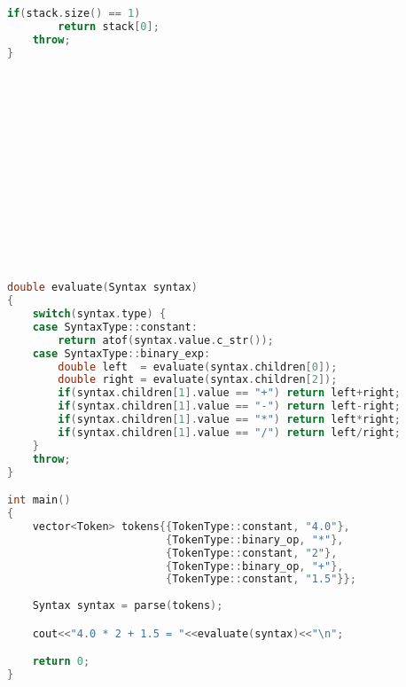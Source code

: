 \documentclass{scrartcl}
\begin{document}
{\begin{lstlisting}[language=C++]
    if(stack.size() == 1)
        return stack[0];
    throw;
}















double evaluate(Syntax syntax)
{
    switch(syntax.type) {
    case SyntaxType::constant:
        return atof(syntax.value.c_str());
    case SyntaxType::binary_exp:
        double left  = evaluate(syntax.children[0]);
        double right = evaluate(syntax.children[2]);
        if(syntax.children[1].value == "+") return left+right;
        if(syntax.children[1].value == "-") return left-right;
        if(syntax.children[1].value == "*") return left*right;
        if(syntax.children[1].value == "/") return left/right;
    }
	throw;
}

int main()
{
    vector<Token> tokens{{TokenType::constant, "4.0"},
                         {TokenType::binary_op, "*"},
                         {TokenType::constant, "2"},
                         {TokenType::binary_op, "+"},
                         {TokenType::constant, "1.5"}};
  
    Syntax syntax = parse(tokens);

    cout<<"4.0 * 2 + 1.5 = "<<evaluate(syntax)<<"\n";

    return 0;
}

\end{lstlisting}}
\end{document}
